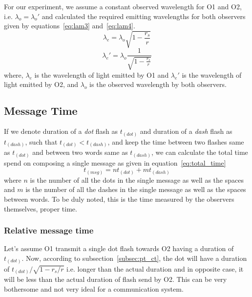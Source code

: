 For our experiment, we assume a constant observed wavelength for O1 and O2, i.e. \(\lambda_o = \lambda_o'\) and calculated the required emitting wavelengths for both 
observers given by equations~\ref{eq:lam3} and~\ref{eq:lam4}.
\begin{equation}\label{eq:lam3}
    \lambda_e = \lambda_o \sqrt{1 - \frac{r_s}{r}} \tag{3.18}
\end{equation}
\begin{equation}\label{eq:lam4}
    \lambda_e' = \lambda_o \frac{1}{\sqrt{1 - \frac{r_s}{r}}} \tag{3.19}
\end{equation}
where, \(\lambda_e\) is the wavelength of light emitted by O1 and \(\lambda_e'\) is the wavelength of light emitted by O2, and \(\lambda_o\) is the observed wavelength by both 
observers. 

\subsection{Message Time}\label{subsec:Fl_t}

If we denote duration of a \emph{dot} flash as \(t_{(dot)}\) and duration of a \emph{dash} flash as \(t_{(dash)}\), such that \(t_{(dot)} < t_{(dash)}\), and keep 
the time between two flashes same as \(t_{(dot)}\) and between two words same as \(t_{(dash)}\), we can calculate the total time spend on composing a single 
message as given in equation~\ref{eq:total_time}
\begin{equation}\label{eq:total_time}
    t_{(msg)} = n  t_{(dot)} + m t_{(dash)} \tag{3.20} 
\end{equation}
where \(n\) is the number of all the dots in the single message as well as the spaces and \(m\) is the number of all the dashes in the single message as well as the spaces between words.
To be duly noted, this is the time measured by the observers themselves, proper time. 

\subsubsection{Relative message time}\label{subsubsec:rel_time}

Let's assume O1 transmit a single dot flash towards O2 having a duration of \(t_{(dot)}\). Now, according to subsection~\ref{subsec:pt_ct}, the dot will have a 
duration of \(t_{(dot)} / \sqrt{1 - r_s/r}\) i.e. longer than the actual duration and in opposite case, it will be less than the actual duration of flash send by O2.
This can be very bothersome and not very ideal for a communication system. 

